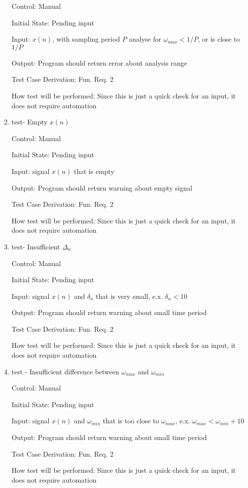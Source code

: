 \documentclass[12pt, titlepage]{article}
\begin{document}
\begin{enumerate}
Control: Manual
					
Initial State: Pending input
					
Input:  $x(n)$, with sampling period $P$ analyse for $\omega_{max} < 1/P$, or is close to $1/P$
					
Output: Program should return error about analysis range

Test Case Derivation: Fun. Req. 2

How test will be performed: Since this is just a quick check for an input, it does not require automation 

\item{test- Empty $x(n)$\\}

Control: Manual
					
Initial State: Pending input
					
Input: signal $x(n)$ that is empty
					
Output: Program should return warning about empty signal

Test Case Derivation: Fun. Req. 2

How test will be performed: Since this is just a quick check for an input, it does not require automation 

\item{test- Insufficient $\Delta_n$\\}

Control: Manual
					
Initial State: Pending input
					
Input: signal $x(n)$ and $\delta_n$ that is very small, e.x. $\delta_n < 10$
					
Output: Program should return warning about small time period

Test Case Derivation: Fun. Req. 2

How test will be performed: Since this is just a quick check for an input, it does not require automation 

\item{test - Insufficient difference between $\omega_{max}$ and $\omega_{min}$  \\}

Control: Manual
					
Initial State: Pending input
					
Input: signal $x(n)$ and $\omega_{min}$ that is too close to $\omega_{max}$, e.x. $\omega_{max} < \omega_{min} + 10 $
					
Output: Program should return warning about small time period

Test Case Derivation: Fun. Req. 2

How test will be performed: Since this is just a quick check for an input, it does not require automation 
					

\end{enumerate}
\end{document}
